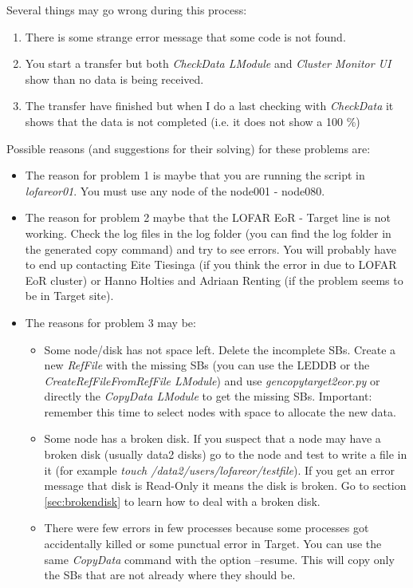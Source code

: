 \documentclass[a4paper,11pt]{article}
\begin{document}
Several things may go wrong during this process:

\begin{enumerate}
	\item There is some strange error message that some code is not found.	
	\item You start a transfer but both \textit{CheckData LModule} and \textit{Cluster Monitor UI} show than no data is being received.
	\item The transfer have finished but when I do a last checking with \textit{CheckData} it shows that the data is not completed (i.e. it does not show a 100 \%) 
\end{enumerate}

Possible reasons (and suggestions for their solving) for these problems are:

\begin{itemize}
	\item The reason for problem 1 is maybe that you are running the script in \textit{lofareor01}. You must use any node of the node001 - node080.
	\item The reason for problem 2 maybe that the LOFAR EoR - Target line is not working. Check the log files in the log folder (you can find the log folder in the generated copy command) and try to see errors. You will probably have to end up contacting Eite Tiesinga (if you think the error in due to LOFAR EoR cluster) or Hanno Holties and Adriaan Renting (if the problem seems to be in Target site).
	\item The reasons for problem 3 may be:
	\begin{itemize}
		\item Some node/disk has not space left. Delete the incomplete SBs. Create a new \textit{RefFile} with the missing SBs (you can use the LEDDB or the \textit{CreateRefFileFromRefFile LModule}) and use \textit{gencopytarget2eor.py} or directly the \textit{CopyData LModule} to get the missing SBs. Important: remember this time to select nodes with space to allocate the new data.
		\item Some node has a broken disk. If you suspect that a node may have a broken disk (usually data2 disks) go to the node and test to write a file in it (for example \textit{touch /data2/users/lofareor/testfile}). If you get an error message that disk is Read-Only it means the disk is broken. Go to section \ref{sec:brokendisk} to learn how to deal with a broken disk.
		\item There were few errors in few processes because some processes got accidentally killed or some punctual error in Target. You can use the same \textit{CopyData} command with the option --resume. This will copy only the SBs that are not already where they should be.
	\end{itemize}
\end{itemize}
\end{document}

